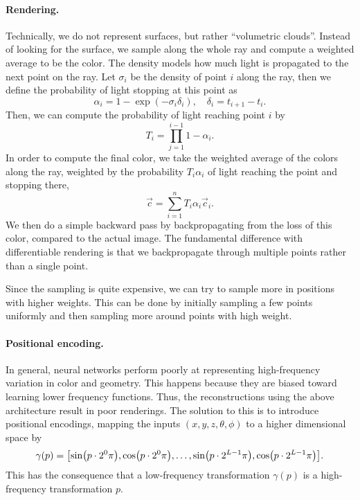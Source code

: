 \paragraph{Rendering.}

Technically, we do not represent surfaces, but rather ``volumetric clouds''. Instead of looking for
the surface, we sample along the whole ray and compute a weighted average to be the color. The
density models how much light is propagated to the next point on the ray. Let $\sigma_i$ be the
density of point $i$ along the ray, then we define the probability of light stopping at this point
as \[
    \alpha_i = 1 - \exp(-\sigma_i \delta_i), \quad \delta_i = t_{i+1} - t_i.
\]
Then, we can compute the probability of light reaching point $i$ by \[
    T_i = \prod_{j=1}^{i-1} 1 - \alpha_i.
\]
In order to compute the final color, we take the weighted average of the colors along the ray,
weighted by the probability $T_i \alpha_i$ of light reaching the point and stopping there, \[
    \vec{c} = \sum_{i=1}^{n} T_i \alpha_i \vec{c}_i.
\]
We then do a simple backward pass by backpropagating from the loss of this color, compared to the
actual image. The fundamental difference with differentiable rendering is that we backpropagate
through multiple points rather than a single point.

Since the sampling is quite expensive, we can try to sample more in positions with higher weights.
This can be done by initially sampling a few points uniformly and then sampling more around points
with high weight.

\paragraph{Positional encoding.}

In general, neural networks perform poorly at representing high-frequency variation in color and
geometry. This happens because they are biased toward learning lower frequency functions. Thus, the
reconstructions using the above architecture result in poor renderings. The solution to this is to
introduce positional encodings, mapping the inputs $(x,y,z,\theta,\phi)$ to a higher dimensional space
by \[
    \gamma(p) = \lft[\sin\lft(p \cdot 2^0 \pi\rgt), \cos\lft(p \cdot 2^0 \pi\rgt), \ldots, \sin\lft(p \cdot 2^{L-1} \pi\rgt), \cos\lft(p \cdot 2^{L-1} \pi\rgt)\rgt].
\]
This has the consequence that a low-frequency transformation \wrt $\gamma(p)$ is a high-frequency
transformation \wrt $p$.

